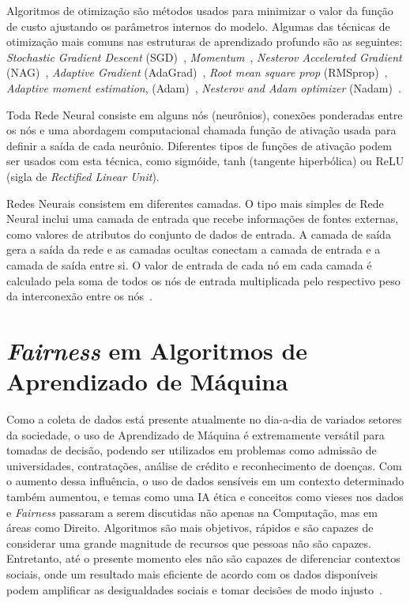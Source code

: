 \documentclass[portugues]{ic-tese}
\begin{document}
Algoritmos de otimização são métodos usados para minimizar o valor da função de custo ajustando os parâmetros internos do modelo. Algumas das técnicas de otimização mais comuns nas estruturas de aprendizado profundo são as seguintes: \textit{Stochastic Gradient Descent} (SGD)~\citep{Schmidt_2013}, \textit{Momentum}~\citep{Polyak_1964}, \textit{Nesterov Accelerated Gradient} (NAG)~\citep{Sutskever_2013}, \textit{Adaptive Gradient} (AdaGrad)~\citep{Duchi_2011}, \textit{Root mean square prop} (RMSprop)~\citep{Graves_2013}, \textit{Adaptive moment estimation}, (Adam)~\citep{Kingma_2014}, \textit{Nesterov and Adam optimizer} (Nadam)~\citep{Dozat_2016}.

Toda Rede Neural consiste em alguns nós (neurônios), conexões ponderadas entre os nós e uma abordagem computacional chamada função de ativação usada para definir a saída de cada neurônio. Diferentes tipos de funções de ativação podem ser usados com esta técnica, como sigmóide, tanh (tangente hiperbólica) ou ReLU (sigla de \textit{Rectified Linear Unit}).

Redes Neurais consistem em diferentes camadas. O tipo mais simples de Rede Neural inclui uma camada de entrada que recebe informações de fontes externas, como valores de atributos do conjunto de dados de entrada. A camada de saída gera a saída da rede e as camadas ocultas conectam a camada de entrada e a camada de saída entre si. O valor de entrada de cada nó em cada camada é calculado pela soma de todos os nós de entrada multiplicada pelo respectivo peso da interconexão entre os nós~\citep{Erb_1993}.

\section{\textit{Fairness} em Algoritmos de Aprendizado de Máquina}
\label{sec:Fairness}

Como a coleta de dados está presente atualmente no dia-a-dia de variados setores da sociedade, o uso de Aprendizado de Máquina é extremamente versátil para tomadas de decisão, podendo ser utilizados em problemas como admissão de universidades, contratações, análise de crédito e reconhecimento de doenças. Com o aumento dessa influência, o uso de dados sensíveis em um contexto determinado também aumentou, e temas como uma IA ética e conceitos como vieses nos dados e \textit{Fairness} passaram a serem discutidas não apenas na Computação, mas em áreas como Direito. Algoritmos são mais objetivos, rápidos e são capazes de considerar uma grande magnitude de recursos que pessoas não são capazes. Entretanto, até o presente momento eles não são capazes de diferenciar contextos sociais, onde um resultado mais eficiente de acordo com os dados disponíveis podem amplificar as desigualdades sociais e tomar decisões de modo injusto~\citep{Mehrabi_2021}. 
\end{document}
